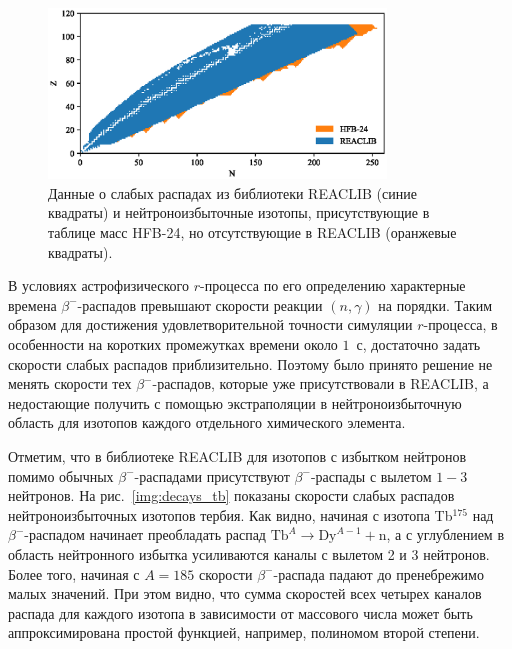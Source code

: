 \begin{figure}
  \centering
  \includegraphics[width=0.8\textwidth]{pics/chart_weak_comparison.eps}
  \caption{Данные о слабых распадах из библиотеки REACLIB (синие квадраты) и нейтроноизбыточные изотопы, присутствующие в таблице масс HFB-24, но отсутствующие в REACLIB (оранжевые квадраты).}
  \label{img:weak_comparison}
\end{figure}

  В условиях астрофизического $r$-процесса по его определению характерные времена $\beta^-$-распадов превышают скорости реакции $(n,\gamma)$ на порядки. Таким образом для достижения удовлетворительной точности симуляции $r$-процесса, в особенности на коротких промежутках времени около $1$~с, достаточно задать скорости слабых распадов приблизительно. Поэтому было принято решение не менять скорости тех $\beta^-$-распадов, которые уже присутствовали в REACLIB, а недостающие получить с помощью экстраполяции в нейтроноизбыточную область для изотопов каждого отдельного химического элемента. 

  Отметим, что в библиотеке REACLIB для изотопов с избытком нейтронов помимо обычных $\beta^-$-распадами присутствуют $\beta^-$-распады с вылетом $1-3$ нейтронов. На рис.~\ref{img:decays_tb} показаны скорости слабых распадов нейтроноизбыточных изотопов тербия. Как видно, начиная с изотопа Tb$^{175}$ над $\beta^-$-распадом начинает преобладать распад $\text{Tb}^A \rightarrow \text{Dy}^{A-1} + \text{n}$, а с углублением в область нейтронного избытка усиливаются каналы с вылетом 2 и 3 нейтронов. Более того, начиная с $A = 185$ скорости $\beta^-$-распада падают до пренебрежимо малых значений. При этом видно, что сумма скоростей всех четырех каналов распада для каждого изотопа в зависимости от массового числа может быть аппроксимирована простой функцией, например, полиномом второй степени.

